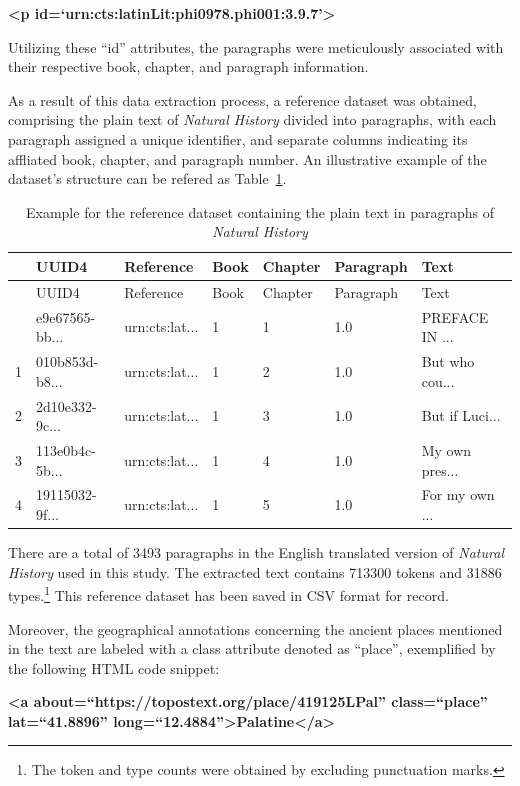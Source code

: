 \documentclass[
  12pt,
]{article}
\begin{document}
\textbf{\textless p
id=`urn:cts:latinLit:phi0978.phi001:3.9.7'\textgreater{}}

Utilizing these ``id'' attributes, the paragraphs were meticulously
associated with their respective book, chapter, and paragraph
information.

As a result of this data extraction process, a reference dataset was
obtained, comprising the plain text of \emph{Natural History} divided
into paragraphs, with each paragraph assigned a unique identifier, and
separate columns indicating its affliated book, chapter, and paragraph
number. An illustrative example of the dataset's structure can be
refered as Table~\ref{tbl-dataset_plaintext}.

\hypertarget{tbl-dataset_plaintext}{}
\begin{longtable}[]{@{}lllllll@{}}
\caption{\label{tbl-dataset_plaintext}Example for the reference dataset
containing the plain text in paragraphs of \emph{Natural
History}}\tabularnewline
\toprule\noalign{}
& UUID4 & Reference & Book & Chapter & Paragraph & Text \\
\midrule\noalign{}
\endfirsthead
\toprule\noalign{}
& UUID4 & Reference & Book & Chapter & Paragraph & Text \\
\midrule\noalign{}
\endhead
\bottomrule\noalign{}
\endlastfoot
0 & e9e67565-bb... & urn:cts:lat... & 1 & 1 & 1.0 & PREFACE IN ... \\
1 & 010b853d-b8... & urn:cts:lat... & 1 & 2 & 1.0 & But who cou... \\
2 & 2d10e332-9c... & urn:cts:lat... & 1 & 3 & 1.0 & But if Luci... \\
3 & 113e0b4c-5b... & urn:cts:lat... & 1 & 4 & 1.0 & My own pres... \\
4 & 19115032-9f... & urn:cts:lat... & 1 & 5 & 1.0 & For my own ... \\
\end{longtable}

There are a total of 3493 paragraphs in the English translated version
of \emph{Natural History} used in this study. The extracted text
contains 713300 tokens and 31886 types.\footnote{The token and type
  counts were obtained by excluding punctuation marks.} This reference
dataset has been saved in CSV format for record.

Moreover, the geographical annotations concerning the ancient places
mentioned in the text are labeled with a class attribute denoted as
``place'', exemplified by the following HTML code snippet:

\textbf{\textless a about=``https://topostext.org/place/419125LPal''
class=``place'' lat=``41.8896''
long=``12.4884''\textgreater Palatine\textless/a\textgreater{}}
\end{document}
